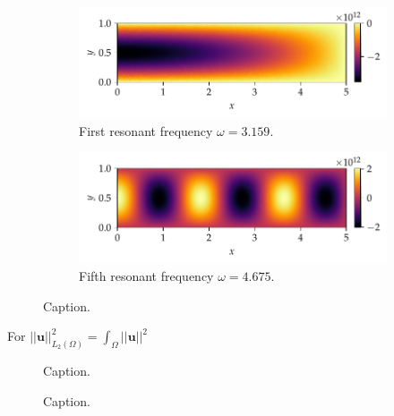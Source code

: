 \documentclass[11pt, a4paper]{article}
\begin{document}

\begin{figure}[ht]
    \centering
    \begin{subfigure}{\textwidth}
        \includegraphics{plots/rectangular_cavity_mode1.pdf}
        \caption{First resonant frequency $\omega = 3.159$.}
    \end{subfigure}
    \begin{subfigure}{\textwidth}
        \includegraphics{plots/rectangular_cavity_mode5.pdf}
        \caption{Fifth resonant frequency $\omega = 4.675$.}
    \end{subfigure}
    \caption{Caption.}
    \label{fig:rectangular-cavity-modes}
\end{figure}

For $||\mathbf{u}||_{L_2(\Omega)}^2 = \int_{\Omega} ||\mathbf{u}||^2$

\begin{figure}[ht]
    \centering
    
    \caption{Caption.}
    \label{fig:rectangular-cavity-norms}
\end{figure}

\begin{figure}[ht]
    \centering
    
    \caption{Caption.}
    \label{fig:rectangular-cavity-errorprogression}
\end{figure}
\end{document}
